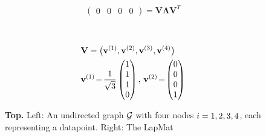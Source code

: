 {{\begin{figure}[H]
\begin{center}
\begin{minipage}{0.4\textwidth}
\begin{equation}
\begin{pmatrix}
							0 & 0 & 0 & 0 
						\end{pmatrix}\!=\!\mathbf{V} {\bm \Lambda} \mathbf{V}^{T}  
						\nonumber
					\end{equation} 
				\end{minipage}
				\vspace*{20mm}\\
				\begin{minipage}{0.4\textwidth}
				\end{minipage} 
    				\begin{minipage}{0.4\textwidth}
										\begin{align}
											& \mathbf{V} = \big( {\bf v}^{(1)},{\bf v}^{(2)},{\bf v}^{(3)},{\bf v}^{(4)} \big) \nonumber \\
											&	\mathbf{v}^{(1)}\!=\!\frac{1}{\sqrt{3}} \begin{pmatrix} 1 \\ 1 \\ 1 \\ 0 \end{pmatrix}, \,
												\mathbf{v}^{(2)}\!=\!\begin{pmatrix} 0 \\ 0 \\ 0 \\ 1 \end{pmatrix} \nonumber 
												\end{align}
				\end{minipage} 
				\caption{\label{fig_lap_mtx_specclustering_dict} {\bf Top.} Left: An undirected \gls{graph} 
					$\mathcal{G}$ with four nodes $i=1,2,3,4$, each representing a \gls{datapoint}. Right: The \gls{LapMat} 
}
\end{center}
\end{figure}}}
